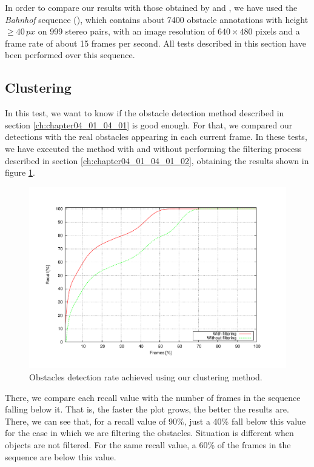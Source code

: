 In order to compare our results with those obtained by \cite{gunyel2012stixels} and \cite{benenson2011stixels}, we have used the \emph{Bahnhof} sequence (\cite{ess2009robust}), which contains about 7400 obstacle annotations with height $\geq 40\,px$ on 999 stereo pairs, with an image resolution of $640 \times 480$ pixels and a frame rate of about 15 frames per second. All tests described in this section have been performed over this sequence.

\subsection{Clustering}\label{ch:chapter04_02_01}

In this test, we want to know if the obstacle detection method described in section \ref{ch:chapter04_01_04_01} is good enough. For that, we compared our detections with the real obstacles appearing in each current frame. In these tests, we have executed the method with and without performing the filtering process described in section \ref{ch:chapter04_01_04_01_02}, obtaining the results shown in figure \ref{fig:cp04_detection_rate}.

\begin{figure}[h!]
\centering
\includegraphics[trim=50 40 80 60,clip]{detectionRate}
\caption{Obstacles detection rate achieved using our clustering method.}\label{fig:cp04_detection_rate}
\end{figure}

There, we compare each recall value with the number of frames in the sequence falling below it. That is, the faster the plot grows, the better the results are. There, we can see that, for a recall value of 90\%, just a 40\% fall below this value for the case in which we are filtering the obstacles. Situation is different when objects are not filtered. For the same recall value, a 60\% of the frames in the sequence are below this value.

